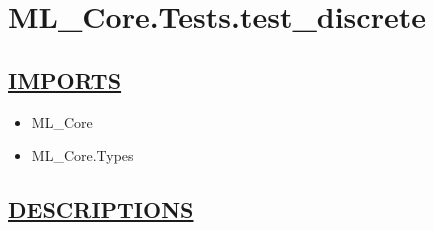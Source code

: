 \chapter*{ML\_Core.Tests.test\_discrete}
\hypertarget{ecldoc:toc:ML_Core.Tests.test_discrete}{}

\section*{\underline{IMPORTS}}
\begin{itemize}
\item ML\_Core
\item ML\_Core.Types
\end{itemize}

\section*{\underline{DESCRIPTIONS}}
